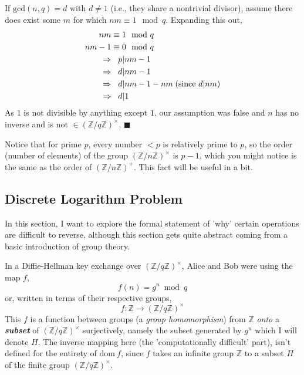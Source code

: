 \documentclass[11pt, a4paper]{report}
\newcommand{\qed}{\hfill $\blacksquare$}
\newcommand{\integers}{\mathbb{Z}}
\begin{document}
	If $\mathrm{gcd}(n,q) = d$ with $d \neq 1$ (i.e., they share a nontrivial divisor), assume there does exist some $m$ for which $nm \equiv 1 \mod q$. Expanding this out,
\begin{align*}
	nm &\equiv 1 \mod q\\
	nm - 1 &\equiv 0 \mod q\\
	\Rightarrow &\hspace*{0.3cm} p | nm-1\\
	\Rightarrow &\hspace*{0.3cm} d | nm-1\\
	\Rightarrow &\hspace*{0.3cm} d | nm-1 -nm\; (\text{since } d|nm)\\
	\Rightarrow &\hspace*{0.3cm} d | 1
\end{align*}
As $1$ is not divisible by anything except $1$, our assumption was false and $n$ has no inverse and is not $\in (\integers / q \integers)^{\times}$.\autocite[19]{koblitz} 
\qed

Notice that for prime $p$, every number $< p$ is relatively prime to $p$, so the order (number of elements) of the group $(\integers / n \integers)^{\times}$ is $p-1$, which you might notice is the same as the order of $(\integers / n \integers)^{+}$. This fact will be useful in a bit.


\subsection{Discrete Logarithm Problem}

In this section, I want to explore the formal statement of 'why' certain operations are difficult to reverse, although this section gets quite abstract coming from a basic introduction of group theory. 

In a Diffie-Hellman key exchange over $(\integers / q \integers)^{\times}$, Alice and Bob were using the map $f$,
\[ f(n) = g^n \bmod q \]
or, written in terms of their respective groups,
\[ f: \integers \rightarrow (\integers / q \integers)^{\times} \]
This $f$ is a function between groups (a \textit{group homomorphism}) from $\integers$ \textit{onto} a \textit{\textbf{subset}} of $(\integers / q \integers)^{\times}$ surjectively, namely the subset generated by $g^n$ which I will denote $H$. The inverse mapping here (the 'computationally difficult' part), isn't defined for the entirety of $\mathrm{dom}\: f$, since $f$ takes an infinite group $\integers$ to a subset $H$ of the finite group $(\integers / q \integers)^{\times}$. 
\end{document}
